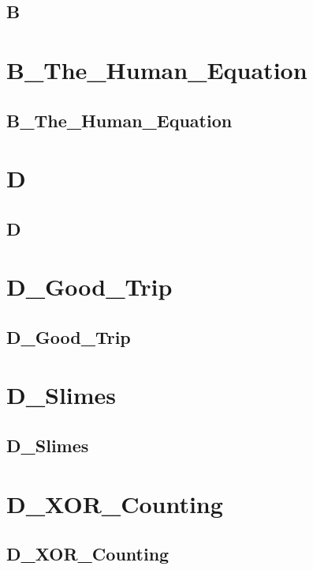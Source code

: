 \subsection{B}
\raggedbottom
\hrulefill

\section{B\_The\_Human\_Equation}
\subsection{B\_The\_Human\_Equation}
\raggedbottom
\hrulefill

\section{D}
\subsection{D}
\raggedbottom
\hrulefill

\section{D\_Good\_Trip}
\subsection{D\_Good\_Trip}
\raggedbottom
\hrulefill

\section{D\_Slimes}
\subsection{D\_Slimes}
\raggedbottom
\hrulefill

\section{D\_XOR\_Counting}
\subsection{D\_XOR\_Counting}
\raggedbottom
\hrulefill

